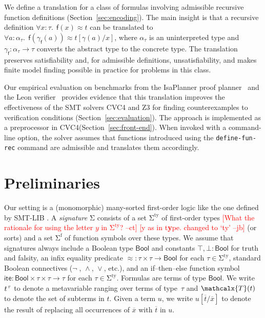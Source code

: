 \documentclass[runningheads,a4paper]{llncs}
\newcommand{\con}[1]{\mathsf{#1}}
\let\const=\con
\renewcommand\vec[1]{\overline{#1}}
\let\oldSigma=\Sigma
\def\Sigma{\mathrm{\oldSigma}}
\let\oldneg=\neg
\def\neg{\oldneg\;}
\let\oldvee=\vee
\def\vee{\mathrel{\oldvee}}
\let\oldwedge=\wedge
\def\wedge{\mathrel{\oldwedge}}
\newcommand\cvc{CVC4\xspace}
\newcommand\ziii{Z3\xspace}
\newcommand{\teq}{\approx}
\newcommand{\terms}{\mathcalx{T}}
\newcommand{\stypes}[1]{#1^\mathrm{ty}}
\newcommand{\sfuns}[1]{#1^\mathrm{f}}
\newcommand\ty[1]{\con{#1}}
\newcommand{\Bool}{\ty{Bool}}
\newcommand{\ltrue}{\top}
\newcommand{\lfalse}{\bot}
\newcommand{\lite}{\con{ite}}
\newcommand\concret{\gamma} %
\newcommand{\farg}[1]{\concret_{#1}}
\newcommand{\fargtype}[1]{\alpha_{#1}}
\newcommand{\rem}[1]{\textcolor{red}{[#1]}}
\newcommand{\jb}[1]{\rem{#1 --jb}}
\newcommand{\ct}[1]{\rem{#1 --ct}}
\newcommand{\vthinspace}{\kern+0.083333em}
\newcommand{\typ}[1]{^{\vthinspace #1}}
\begin{document}
We define a translation for a class of
formulas involving admissible recursive function definitions
(Section~\ref{sec:encoding}). The main insight is that a
recursive definition $\forall x : \tau.\;\, \const{f}(x) \teq t$
can be translated to
$\forall a :
\fargtype{\tau}.\;\, \const{f}(\farg{\con{f}}(a)) \teq t[\concret(a)/x]$, where
$\fargtype{\tau}$ is an uninterpreted  type and $\farg{\con{f}} :
\fargtype{\tau} \to \tau$ converts the abstract type to the concrete
type. The translation preserves satisfiability and, for admissible definitions,
unsatisfiability, and makes finite model finding possible in practice
for problems in this class.

Our empirical evaluation on benchmarks from the IsaPlanner proof planner~\cite{DBLP:conf/itp/JohanssonDB10}
and the Leon verifier~\cite{blanc2013overview} provides
evidence that this translation improves the effectiveness of the SMT solvers
\cvc and \ziii for finding counterexamples to verification conditions
(Section~\ref{sec:evaluation}). The approach is implemented as a preprocessor
in \cvc (Section~\ref{sec:front-end}). When invoked with a
command-line option, the solver assumes that functions introduced using the
\texttt{define-fun-rec} command are admissible and translates them accordingly.


\section{Preliminaries}
\label{sec:prelim}

Our setting is a (monomorphic) many-sorted first-order logic
like the one defined by SMT-LIB \cite{smtlib25}.
A \emph{signature} $\Sigma$ consists of
a set $\stypes{\Sigma}$ of %
first-order types
%
\ct{What the rationale for using the letter $y$ in $\stypes{\Sigma}$?}
\jb{y as in t\textbf{y}pe. changed to `ty'}
(or sorts) and a set $\sfuns{\Sigma}$ of function symbols over these types.
We assume that signatures always include a Boolean type $\Bool$ and constants
$\ltrue, \lfalse : \Bool$ for truth and falsity,
an infix equality predicate ${\teq} : \tau \times \tau \to \Bool$
for each $\tau \in \stypes{\Sigma}$,
standard Boolean connectives ($\neg$, $\wedge$, $\vee$, etc.),
and an if--then--else function symbol
$\lite : \Bool \times \tau \times \tau \rightarrow \tau$
for each $\tau \in \stypes{\Sigma}$.
Formulas are terms of type $\Bool$.
We write $t\typ{\tau}$ to denote a metavariable ranging over terms of
type~$\tau$ and $\terms( t )$ to denote the set of subterms in $t$.
Given a term $u$, we write $u[\vec t/\vec x]$ to denote the result of replacing
all occurrences of $\vec x$ with $\vec t$ in $u$.
\end{document}

